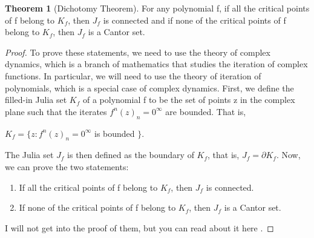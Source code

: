 \documentclass[a4paper,11pt]{article}
\theoremstyle{definition}
\newtheorem{theorem}[defn]{Theorem} %
\numberwithin{equation}{section} %
\begin{document}
\begin{theorem}[Dichotomy Theorem]
    For any polynomial f, if all the critical points of f belong to $K_f$, then $J_f$ is connected and if none of the critical points of f belong to $K_f$, then $J_f$ is a Cantor set.
\end{theorem}
\begin{proof}
    To prove these statements, we need to use the theory of complex dynamics, which is a branch of mathematics that studies the iteration of complex functions. In particular, we will need to use the theory of iteration of polynomials, which is a special case of complex dynamics.
    First, we define the filled-in Julia set $K_f$ of a polynomial f to be the set of points z in the complex plane such that the iterates ${f^n(z)}_n = 0^{\infty}$ are bounded. That is,
    \begin{center}
        $K_f = \{ z : {f^n(z)}_n = 0^{\infty} $ is bounded $ \}$.
    \end{center}
    The Julia set $J_f$ is then defined as the boundary of $K_f$, that is, $J_f = \partial K_f$.
    Now, we can prove the two statements:
    \begin{enumerate}
        \item If all the critical points of f belong to $K_f$, then $J_f$ is connected.
        \item If none of the critical points of f belong to $K_f$, then $J_f$ is a Cantor set.
    \end{enumerate}
    I will not get into the proof of them, but you can read about it here \cite{dichotomy}.

\end{proof}



\printbibliography
\end{document}
